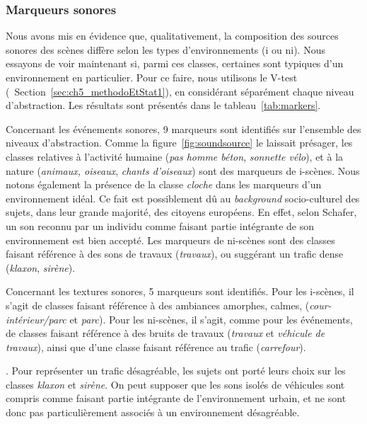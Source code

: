 \subsubsection{Marqueurs sonores}

Nous avons mis en évidence que, qualitativement, la composition des sources sonores des scènes diffère selon les types d'environnements (i ou ni). Nous essayons de voir maintenant si, parmi ces classes, certaines sont typiques d'un environnement en particulier. Pour ce faire, nous utilisons le V-test (\cf~Section~\ref{sec:ch5_methodoEtStat1}), en considérant séparément chaque niveau d'abstraction. Les résultats sont présentés dans le tableau~\ref{tab:markers}.

Concernant les événements sonores, 9 marqueurs sont identifiés sur l'ensemble des niveaux d'abstraction. Comme la figure~\ref{fig:soundsource} le laissait présager, les classes relatives à l'activité humaine (\emph{pas homme béton}, \emph{sonnette vélo}), et à la nature (\emph{animaux, oiseaux}, \emph{chants d'oiseaux}) sont des marqueurs de i-scènes. Nous notons également la présence de la classe \emph{cloche} dans les marqueurs d'un environnement idéal. Ce fait est possiblement dû au \emph{background} socio-culturel des sujets, dans leur grande majorité, des citoyens européens. En effet, selon Schafer, un son reconnu par un individu comme faisant partie intégrante de son environnement est bien accepté. Les marqueurs de ni-scènes sont des classes faisant référence à des sons de travaux (\emph{travaux}), ou suggérant un trafic dense (\emph{klaxon}, \emph{sirène}).

Concernant les textures sonores, 5 marqueurs sont identifiés. Pour les i-scènes, il s'agit de classes faisant référence à des ambiances amorphes, calmes, (\emph{cour-intérieur/parc} et \emph{parc}). Pour les ni-scènes, il s'agit, comme pour les événements, de classes faisant référence à des bruits de travaux (\emph{travaux} et \emph{véhicule de travaux}), ainsi que d'une classe faisant référence au trafic (\emph{carrefour}).


. Pour représenter un trafic désagréable, les sujets ont porté leurs choix sur les classes \emph{klaxon} et \emph{sirène}. On peut supposer que les sons isolés de véhicules sont compris comme faisant partie intégrante de l'environnement urbain, et ne sont donc pas particulièrement associés à un environnement désagréable. \\ 

